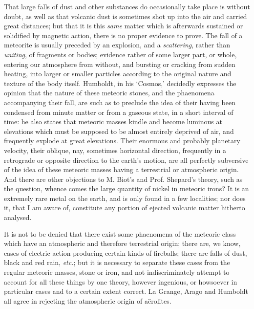 \documentclass[a4paper, 12pt, oneside]{article}
\begin{document}
That large falls of dust and other substances do occasionally take place is without doubt, as well as that volcanic dust is sometimes shot up into the air and carried great distances; but that it is this \emph{same} matter which is afterwards sustained or solidified by magnetic action, there is no proper evidence to prove. The fall of a meteorite is usually preceded by an explosion, and a \emph{scattering}, rather than \emph{uniting}, of fragments or bodies; evidence rather of some larger part, or whole, entering our atmosphere from without, and bursting or cracking from sudden heating, into larger or smaller particles according to the original nature and texture of the body itself. Humboldt, in his `Cosmos,' decidedly expresses the opinion that the nature of these meteoric stones, and the phaenomena accompanying their fall, are such as to preclude the idea of their having been condensed from minute matter or from a gaseous state, in a short interval of time: he also states that meteoric masses kindle and become luminous at elevations which must be supposed to be almost entirely deprived of air, and frequently explode at great elevations. Their enormous and probably planetary velocity, their oblique, nay, sometimes horizontal direction, frequently in a retrograde or opposite direction to the earth's motion, are all perfectly subversive of the idea of these meteoric masses having a terrestrial or atmospheric origin. And there are other objections to M. Biot's and Prof. Shepard's theory, such as the question, whence comes the large quantity of nickel in meteoric irons? It is an extremely rare metal on the earth, and is only found in a few localities; nor does it, that I am aware of, constitute any portion of ejected volcanic matter hitherto analysed.

It is not to be denied that there exist some phaenomena of the meteoric class which have an atmospheric and therefore terrestrial origin; there are, we know, cases of electric action producing certain kinds of fireballs; there are falls of dust, black and red rain, \emph{etc.}; but it is necessary to separate these cases from the regular meteoric masses, stone or iron, and not indiscriminately attempt to account for all these things by one theory, however ingenious, or howsoever in particular cases and to a certain extent correct. La Grange, Arago and Humboldt all agree in rejecting the atmospheric origin of aërolites.
\end{document}
